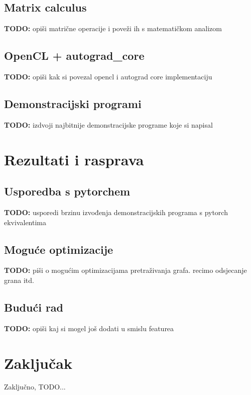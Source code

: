 \documentclass[zavrsnirad]{fer}
\begin{document}
\section{Matrix calculus}
\textbf{TODO:} opiši matrične operacije i poveži ih s matematičkom analizom
\blindtext

\section{OpenCL + autograd\_core}
\textbf{TODO:} opiši kak si povezal opencl i autograd core implementaciju
\blindtext

\section{Demonstracijski programi}
\textbf{TODO:} izdvoji najbitnije demonstracijske programe koje si napisal
\blindtext

\chapter{Rezultati i rasprava}
\label{pog:rezultati_i_rasprava}

\section{Usporedba s pytorchem}
\textbf{TODO:} usporedi brzinu izvođenja demonstracijskih programa s pytorch ekvivalentima
\blindtext

\section{Moguće optimizacije}
\textbf{TODO:} piši o mogućim optimizacijama pretraživanja grafa. recimo odsjecanje grana itd.
\blindtext

\section{Budući rad}
\textbf{TODO:} opiši kaj si mogel još dodati u smislu featurea
\blindtext


\chapter{Zaključak}
\label{pog:zakljucak}

Zaključno, TODO...
\blindtext
\end{document}
